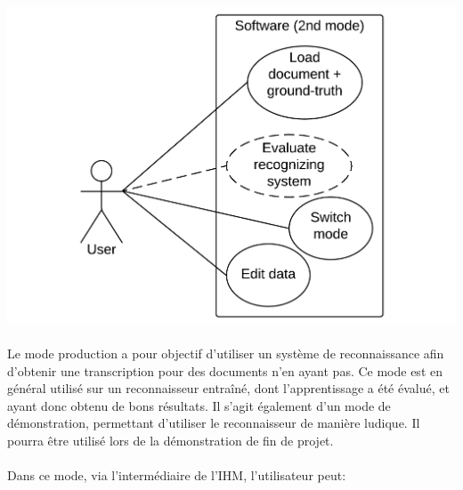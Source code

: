 \paragraph{}

\begin{mdframed}[frametitle={Figure 3 : Diagramme de cas d'utilisation (mode évaluation)}, innerbottommargin=10]
\begin{center}
\includegraphics[width=\linewidth]{Usecase_2.pdf}
\end{center}
\end{mdframed}

\paragraph{}

Le mode production a pour objectif d’utiliser un système de reconnaissance afin d’obtenir une transcription pour des documents n’en ayant pas. Ce mode est en général utilisé sur un reconnaisseur entraîné, dont l’apprentissage a été évalué, et ayant donc obtenu de bons résultats. Il s’agit également d’un mode de démonstration, permettant d’utiliser le reconnaisseur de manière ludique. Il pourra être utilisé lors de la démonstration de fin de projet.

\paragraph{}

Dans ce mode, via l'intermédiaire de l’IHM, l’utilisateur peut:

